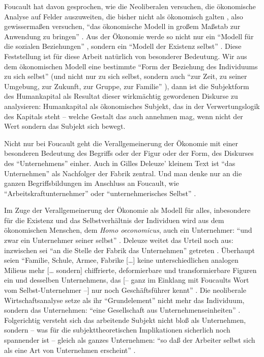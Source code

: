\documentclass[12pt,
               DIV13,
               paper=a4,
               twoside=false,
               onehalfspacing,
               bibliography=totoc,
               toc=graduated,
               draft,
               ]{scrartcl}
\newcommand{\lips}{\dots\unkern}
\newcommand{\tit}[1]{\textit{#1}}
\newcommand{\pc}[2]{\parencite[#1]{#2}}
\newcommand{\vgl}[2]{\parencite[vgl.][#1]{#2}}
\newcommand{\worries}[1]{\ifdraft{\textcolor{blue}{\texttt{(#1)}}}{}}
\newcommand{\hoe}{\tit{Homo oeconomicus}\xspace}
\begin{document}
Foucault hat davon gesprochen, wie die Neoliberalen versuchen, die
ökonomische Analyse auf Felder auszuweiten, die bisher nicht als
ökonomisch galten \vgl{305}{gbp}, also gewissermaßen versuchen, "`das
ökonomische Modell in großem Maßstab zur Anwendung zu bringen"'
\pc{334}{gbp}. Aus der Ökonomie werde so nicht nur ein "`Modell für
die sozialen Beziehungen"' \pc{334}{gbp}, sondern ein "`Modell der
Existenz selbst"' \pc{334}{gbp}. Diese Feststellung ist für diese
Arbeit natürlich von besonderer Bedeutung. Wir aus dem ökonomischen
Modell eine bestimmte "`Form der Beziehung des Individuums zu sich
selbst"' \pc{334}{gbp} (und nicht nur zu sich selbst, sondern auch
"`zur Zeit, zu seiner Umgebung, zur Zukunft, zur Gruppe, zur Familie"'
\pc{334}{gbp}), dann ist die Subjektform des Humankapital als Resultat
dieser wirkmächtig gewordenen Diskurse zu analysieren: Humankapital
als ökonomisches Subjekt, das in der Verwertungslogik des Kapitals
steht -- welche Gestalt das auch annehmen mag, wenn nicht der Wert
sondern das Subjekt sich bewegt.

Nicht nur bei Foucault geht die Verallgemeinerung der Ökonomie mit
einer besonderen Bedeutung des Begriffs oder der Figur oder der Form,
des Diskurses des "`Unternehmens"' einher. Auch in Gilles Deleuze'
kleinem Text  \pc{}{ps} ist "`das Unternehmen"' als
Nachfolger der Fabrik zentral. Und man denke nur an die ganzen
Begriffsbildungen im Anschluss an Foucault, wie
"`Arbeitskraftunternehmer"' oder "`unternehmerisches Selbst"'
\worries{?}.

Im Zuge der Verallgemeinerung der Ökonomie als Modell für alles,
inbesondere für die Existenz und das Selbstverhältnis der Individuen
wird aus dem ökonomischen Menschen, dem \hoe, auch ein Unternehmer:
"`und zwar ein Unternehmer seiner selbst"' \pc{314}{gbp}. Deleuze
weitet das Urteil noch aus: inzwischen sei "`an die Stelle der Fabrik
das Unternehmen"' getreten \pc{256}{ps}. Überhaupt seien "`Familie,
Schule, Armee, Fabrike [\lips] keine unterschiedlichen analogen
Milieus mehr [\lips{} sondern] chiffrierte, deformierbare und
transformierbare Figuren ein und desselben Unternehmens, das [-- ganz
im Einklang mit Foucaults Wort vom Selbst-Unternehmer --] nur noch
Geschäftsführer kennt"' \pc{260}{ps}. Die neoliberale
Wirtschaftsanalyse setze als ihr "`Grundelement"' \pc{313}{gbp} nicht
mehr das Individuum, sondern das Unternehmen: "`eine Gesellschaft aus
Unternehmenseinheiten"' \pc{313}{gbp}. Folgerichtig versteht sich das
arbeitende Subjekt nicht bloß als Unternehmen, sondern -- was für die
subjekttheoretischen Implikationen sicherlich noch spannender ist --
gleich als ganzes Unternehmen: "`so daß der Arbeiter selbst sich als
eine Art von Unternehmen erscheint"' \pc{313}{gbp}.
\end{document}
